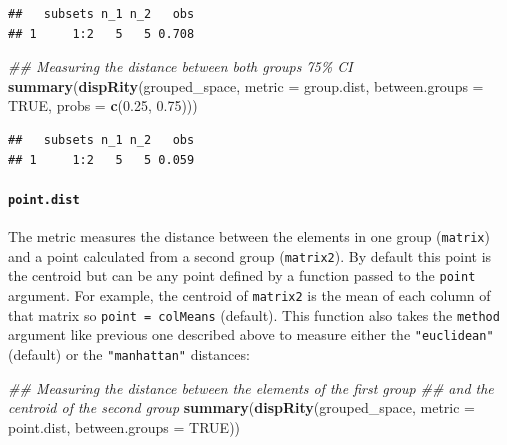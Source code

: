 \documentclass[
]{book}
\newenvironment{Shaded}{\begin{snugshade}}{\end{snugshade}}
\newcommand{\CommentTok}[1]{\textcolor[rgb]{0.56,0.35,0.01}{\textit{#1}}}
\newcommand{\DataTypeTok}[1]{\textcolor[rgb]{0.13,0.29,0.53}{#1}}
\newcommand{\FloatTok}[1]{\textcolor[rgb]{0.00,0.00,0.81}{#1}}
\newcommand{\KeywordTok}[1]{\textcolor[rgb]{0.13,0.29,0.53}{\textbf{#1}}}
\newcommand{\NormalTok}[1]{#1}
\newcommand{\OtherTok}[1]{\textcolor[rgb]{0.56,0.35,0.01}{#1}}
\begin{document}
\begin{verbatim}
##   subsets n_1 n_2   obs
## 1     1:2   5   5 0.708
\end{verbatim}

\begin{Shaded}
\begin{Highlighting}[]
\CommentTok{\#\# Measuring the distance between both group\textquotesingle{}s 75\% CI}
\KeywordTok{summary}\NormalTok{(}\KeywordTok{dispRity}\NormalTok{(grouped\_space, }\DataTypeTok{metric =}\NormalTok{ group.dist,}
                 \DataTypeTok{between.groups =} \OtherTok{TRUE}\NormalTok{, }\DataTypeTok{probs =} \KeywordTok{c}\NormalTok{(}\FloatTok{0.25}\NormalTok{, }\FloatTok{0.75}\NormalTok{)))}
\end{Highlighting}
\end{Shaded}

\begin{verbatim}
##   subsets n_1 n_2   obs
## 1     1:2   5   5 0.059
\end{verbatim}

\hypertarget{point.dist}{%
\paragraph{\texorpdfstring{\texttt{point.dist}}{point.dist}}\label{point.dist}}

The metric measures the distance between the elements in one group (\texttt{matrix}) and a point calculated from a second group (\texttt{matrix2}).
By default this point is the centroid but can be any point defined by a function passed to the \texttt{point} argument.
For example, the centroid of \texttt{matrix2} is the mean of each column of that matrix so \texttt{point\ =\ colMeans} (default).
This function also takes the \texttt{method} argument like previous one described above to measure either the \texttt{"euclidean"} (default) or the \texttt{"manhattan"} distances:

\begin{Shaded}
\begin{Highlighting}[]
\CommentTok{\#\# Measuring the distance between the elements of the first group}
\CommentTok{\#\# and the centroid of the second group}
\KeywordTok{summary}\NormalTok{(}\KeywordTok{dispRity}\NormalTok{(grouped\_space, }\DataTypeTok{metric =}\NormalTok{ point.dist,}
                 \DataTypeTok{between.groups =} \OtherTok{TRUE}\NormalTok{))}
\end{Highlighting}
\end{Shaded}
\end{document}
